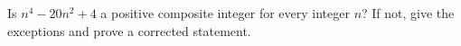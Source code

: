 Is $n^4-20n^2+4$ a positive composite integer for every integer $n$? If not, give the exceptions and prove a corrected statement.
